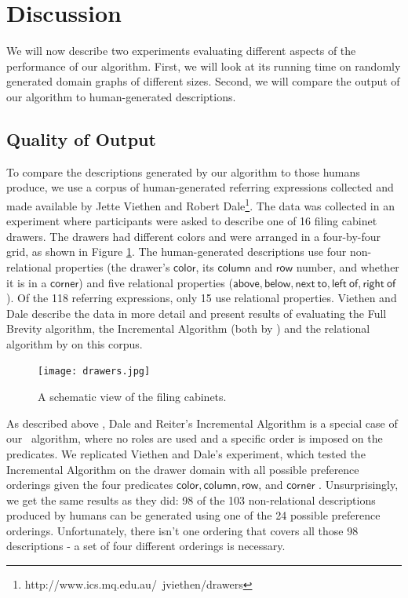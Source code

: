 \section{Discussion} \label{sec:discussion}

We will now describe two experiments evaluating different aspects of
the performance of our algorithm. First, we will look at its running
time on randomly generated domain graphs of different sizes. Second,
we will compare the output of our algorithm to human-generated
descriptions.



\subsection{Quality of Output}

To compare the descriptions generated by our algorithm to
those humans produce, we use a corpus of
human-generated referring expressions collected and made available by
Jette Viethen and Robert
Dale\footnote{http://www.ics.mq.edu.au/~jviethen/drawers}.  The data
was collected in an experiment where participants were asked to
describe one of 16 filing cabinet drawers. The drawers had different
colors and were arranged in a four-by-four grid, as shown in Figure
\ref{fig:drawers}. The human-generated descriptions use four
non-relational properties (the drawer's $\mathsf{color}$, its $\mathsf{column}$ and
$\mathsf{row}$ number, and whether it is in a $\mathsf{corner}$) and five
relational properties ($\mathsf{above, below, next\ to, left\ of,
right\ of}$). Of the 118 referring expressions, only 15 use relational properties.
Viethen and Dale 
describe the data in more detail and present results of evaluating the
Full Brevity algorithm, the Incremental Algorithm (both by
\cite{Dale1995}) and the relational algorithm by
\cite{dale91:_gener_refer_expres_invol_relat} on this corpus.


\begin{figure}
\texttt{[image: drawers.jpg]}
\caption{A schematic view of the filing cabinets.}\label{fig:drawers}
\end{figure}


As described above , Dale and Reiter's
Incremental Algorithm is a special case of our \el\ algorithm, where
no roles are used and a specific order is imposed on the
predicates. We replicated Viethen and Dale's experiment, which tested
the Incremental Algorithm on the drawer domain with all possible
preference orderings given the four predicates $\mathsf{color, column,
row}$, and $\mathsf{corner}$
\cite{viethen06:_algor_for_gener_refer_expres}.  Unsurprisingly, we
get the same results as they did: 98 of the 103 non-relational
descriptions produced by humans can be generated using one of the 24
possible preference orderings. Unfortunately, there isn't one ordering
that covers all those 98 descriptions - a set of four different
orderings is necessary.



